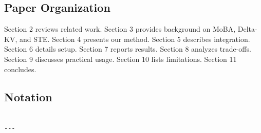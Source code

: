 \subsection{Paper Organization}

Section 2 reviews related work. Section 3 provides background on MoBA, 
Delta-KV, and STE. Section 4 presents our method. Section 5 describes 
integration. Section 6 details setup. Section 7 reports results. Section 8 
analyzes trade-offs. Section 9 discusses practical usage. Section 10 lists 
limitations. Section 11 concludes.



\subsection{Notation}

\begin{lstlisting}

---
\end{lstlisting}